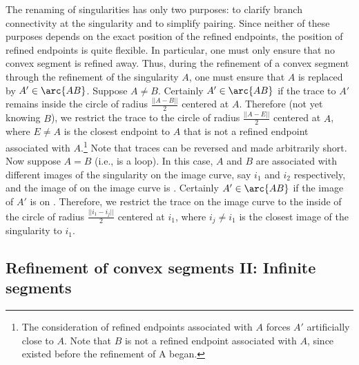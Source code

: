 The renaming of singularities has only two purposes: to clarify branch
connectivity at the singularity and to simplify pairing.
Since neither of these purposes depends on the exact position of the refined endpoints,
the position of refined endpoints is quite flexible.
\label{page-flex}
In particular, one must only ensure that no convex segment is refined away.
Thus, during the refinement of a convex segment  through the refinement
of the singularity $A$, one must ensure that $A$ is replaced by 
$A' \in \arc{AB}$.
Suppose $A \neq B$.
Certainly $A' \in \arc{AB}$ if the trace to $A'$ remains inside
the circle of radius $\frac{||A - B||}{2}$ centered at $A$.
Therefore (not yet knowing $B$), we restrict the trace to the circle
of radius $\frac{||A - E||}{2}$ centered at $A$, where $E \neq A$ is the closest endpoint
to $A$ that is not a refined endpoint associated with $A$.\footnote{The consideration of 
	refined endpoints
	associated with $A$ forces $A'$ artificially close to $A$.
	Note that $B$ is not 
	a refined endpoint associated with $A$, since  
	existed before the refinement of A began.}
Note that traces can be reversed and made arbitrarily short.
Now suppose $A = B$ (i.e.,  is a loop).
In this case, $A$ and $B$ are associated with different images 
of the singularity on the image curve, say $i_{1}$ and $i_{2}$ respectively, and 
the image of  on the image curve is .
Certainly $A' \in \arc{AB}$ if the image of $A'$ is on .
Therefore, we restrict the trace on the image curve to the
inside of the circle of radius
$\frac{||i_{1} - i_{j}||}{2}$ centered at $i_{1}$, 
where $i_{j} \neq i_{1}$ is the closest image of the singularity to $i_{1}$.


\subsection{Refinement of convex segments II: Infinite segments}
\label{sec-refine2}

